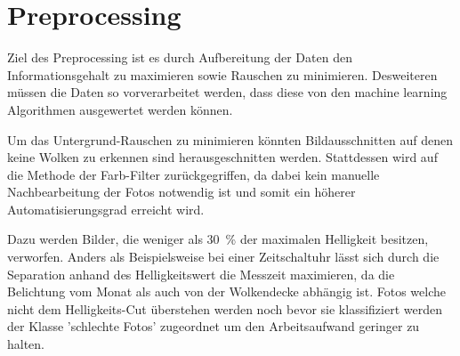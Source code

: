 \section{Preprocessing}
\label{sec:03_Preprocessing}
Ziel des Preprocessing ist es durch Aufbereitung der Daten den
Informationsgehalt zu maximieren sowie Rauschen zu minimieren.
Desweiteren müssen die Daten so vorverarbeitet werden, dass diese 
von den machine learning Algorithmen ausgewertet werden können. 

Um das Untergrund-Rauschen zu minimieren könnten Bildausschnitten auf 
denen keine Wolken zu erkennen sind herausgeschnitten werden.
Stattdessen wird auf die Methode der Farb-Filter zurückgegriffen, da dabei 
kein manuelle Nachbearbeitung der Fotos notwendig ist und somit ein höherer 
Automatisierungsgrad erreicht wird.

Dazu werden Bilder, die weniger als \SI{30}{\percent} der maximalen Helligkeit 
besitzen, verworfen. 
Anders als Beispielsweise bei einer Zeitschaltuhr lässt sich durch die
Separation anhand des Helligkeitswert die Messzeit maximieren, da die 
Belichtung vom Monat als auch von der Wolkendecke abhängig ist.
Fotos welche nicht dem Helligkeits-Cut überstehen werden noch bevor 
sie klassifiziert werden der Klasse 'schlechte Fotos' zugeordnet um 
den Arbeitsaufwand geringer zu halten.

